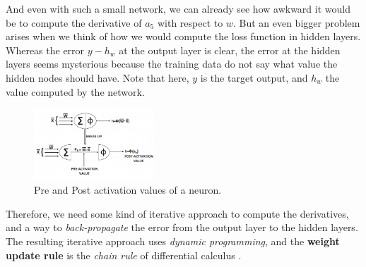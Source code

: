 \documentclass{article}
\begin{document}
  And even with such a small network, we can already see how awkward it would be to compute the derivative of $a_5$ with respect to $w$. But an even bigger problem arises when we think of how we would compute the loss function in hidden layers. Whereas the error $y -h_w$ at the output layer is clear, the error at the hidden layers seems mysterious because the training data do not say what value the hidden nodes should have. Note that here, $y$ is the target output, and $h_w$ the value computed by the network.
\begin{figure} %
    \centering
    \label{simpleNet}
    \includegraphics[width=0.4\textwidth]{pre-post-neuron}
    \caption{Pre and Post activation values of a neuron.}
\end{figure}

  Therefore, we need some kind of iterative approach to compute the derivatives, and a way to \textit{back-propagate} the error from the output layer to the hidden layers. The resulting iterative approach uses \textit{dynamic programming}, and the \textbf{weight update rule} is the \textit{chain rule} of differential calculus \citep{inbook:Aggarwal-3.2}.
\end{document}
